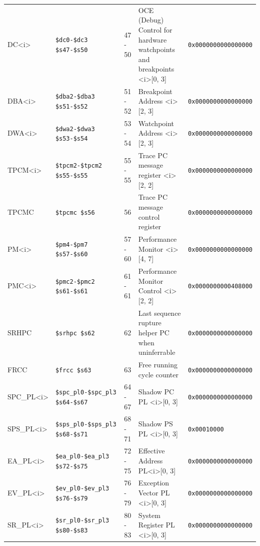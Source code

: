 {\begin{tabular}{|l|l|l|l|l|}
DC\textless i\textgreater & \verb|$dc0-$dc3 $s47-$s50| & 47 - 50 & OCE (Debug) Control for hardware watchpoints and breakpoints \textless i\textgreater [0, 3] & \verb|0x0000000000000000| \\
DBA\textless i\textgreater & \verb|$dba2-$dba3 $s51-$s52| & 51 - 52 & Breakpoint Address \textless i\textgreater [2, 3] & \verb|0x0000000000000000| \\
DWA\textless i\textgreater & \verb|$dwa2-$dwa3 $s53-$s54| & 53 - 54 & Watchpoint Address \textless i\textgreater [2, 3] & \verb|0x0000000000000000| \\
TPCM\textless i\textgreater & \verb|$tpcm2-$tpcm2 $s55-$s55| & 55 - 55 & Trace PC message register \textless i\textgreater [2, 2] & \verb|0x0000000000000000| \\
TPCMC & \verb|$tpcmc $s56| & 56 & Trace PC message control register & \verb|0x0000000000000000| \\
PM\textless i\textgreater & \verb|$pm4-$pm7 $s57-$s60| & 57 - 60 & Performance Monitor \textless i\textgreater [4, 7] & \verb|0x0000000000000000| \\
PMC\textless i\textgreater & \verb|$pmc2-$pmc2 $s61-$s61| & 61 - 61 & Performance Monitor Control \textless i\textgreater [2, 2] & \verb|0x0000000000408000| \\
SRHPC & \verb|$srhpc $s62| & 62 & Last sequence rupture helper PC when uninferrable & \verb|0x0000000000000000| \\
FRCC & \verb|$frcc $s63| & 63 & Free running cycle counter & \verb|0x0000000000000000| \\
SPC\_PL\textless i\textgreater & \verb|$spc_pl0-$spc_pl3 $s64-$s67| & 64 - 67 & Shadow PC PL \textless i\textgreater [0, 3] & \verb|0x0000000000000000| \\
SPS\_PL\textless i\textgreater & \verb|$sps_pl0-$sps_pl3 $s68-$s71| & 68 - 71 & Shadow PS PL \textless i\textgreater [0, 3] & \verb|0x00010000| \\
EA\_PL\textless i\textgreater & \verb|$ea_pl0-$ea_pl3 $s72-$s75| & 72 - 75 & Effective Address PL\textless i\textgreater [0, 3] & \verb|0x0000000000000000| \\
EV\_PL\textless i\textgreater & \verb|$ev_pl0-$ev_pl3 $s76-$s79| & 76 - 79 & Exception Vector PL \textless i\textgreater [0, 3] & \verb|0x0000000000000000| \\
SR\_PL\textless i\textgreater & \verb|$sr_pl0-$sr_pl3 $s80-$s83| & 80 - 83 & System Register PL \textless i\textgreater [0, 3] & \verb|0x0000000000000000| \\

\end{tabular}}
